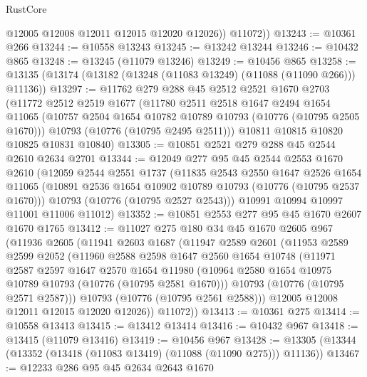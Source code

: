 \begin{lexlean}{RustCore}
\begin{coremodule}
            @12005
            @12008
            @12011
            @12015
            @12020
            @12026))
        @11072))
@13243 := @10361 @266
@13244 := @10558 @13243
@13245 := @13242 @13244
@13246 := @10432 @865
@13248 := @13245 (@11079 @13246)
@13249 := @10456 @865
@13258 := @13135 (@13174 (@13182 (@13248 (@11083 @13249) (@11088 (@11090 @266))) @11136))
@13297 := @11762
    @279
    @288
    @45
    @2512
    @2521
    @1670
    @2703
    (@11772
      @2512
      @2519
      @1677
      (@11780
        @2511
        @2518
        @1647
        @2494
        @1654
        @11065
        (@10757 @2504 @1654 @10782 @10789 @10793 (@10776 (@10795 @2505 @1670)))
        @10793
        (@10776 (@10795 @2495 @2511)))
      @10811
      @10815
      @10820
      @10825
      @10831
      @10840)
@13305 := @10851 @2521 @279 @288 @45 @2544 @2610 @2634 @2701
@13344 := @12049
    @277
    @95
    @45
    @2544
    @2553
    @1670
    @2610
    (@12059
      @2544
      @2551
      @1737
      (@11835
        @2543
        @2550
        @1647
        @2526
        @1654
        @11065
        (@10891 @2536 @1654 @10902 @10789 @10793 (@10776 (@10795 @2537 @1670)))
        @10793
        (@10776 (@10795 @2527 @2543)))
      @10991
      @10994
      @10997
      @11001
      @11006
      @11012)
@13352 := @10851 @2553 @277 @95 @45 @1670 @2607 @1670 @1765
@13412 := @11027
    @275
    @180
    @34
    @45
    @1670
    @2605
    @967
    (@11936
      @2605
      (@11941
        @2603
        @1687
        (@11947
          @2589
          @2601
          (@11953
            @2589
            @2599
            @2052
            (@11960
              @2588
              @2598
              @1647
              @2560
              @1654
              @10748
              (@11971
                @2587
                @2597
                @1647
                @2570
                @1654
                @11980
                (@10964 @2580 @1654 @10975 @10789 @10793 (@10776 (@10795 @2581 @1670)))
                @10793
                (@10776 (@10795 @2571 @2587)))
              @10793
              (@10776 (@10795 @2561 @2588)))
            @12005
            @12008
            @12011
            @12015
            @12020
            @12026))
        @11072))
@13413 := @10361 @275
@13414 := @10558 @13413
@13415 := @13412 @13414
@13416 := @10432 @967
@13418 := @13415 (@11079 @13416)
@13419 := @10456 @967
@13428 := @13305 (@13344 (@13352 (@13418 (@11083 @13419) (@11088 (@11090 @275))) @11136))
@13467 := @12233
    @286
    @95
    @45
    @2634
    @2643
    @1670

\end{coremodule}
\end{lexlean}
